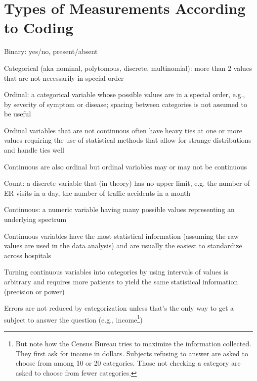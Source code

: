 \section{Types of Measurements According to Coding}  \label{sec:overview-coding}
\bi
 \item Binary: yes/no, present/absent
 \item Categorical (aka nominal, polytomous, discrete, multinomial):
   more than 2 values that are not necessarily in special order
 \item Ordinal: a categorical variable whose possible values are in a
   special order, e.g., by severity of symptom or disease; spacing
   between categories is not assumed to be useful
  \bi
  \item Ordinal variables that are not continuous often have heavy
    ties at one or more values requiring the use of statistical
    methods that allow for strange distributions and handle ties well
  \item Continuous are also ordinal but ordinal variables may or may
    not be continuous
  \ei
 \item Count: a discrete variable that (in theory) has no upper limit, e.g. the number of ER visits in a day, the number of traffic accidents in a month
 \item Continuous: a numeric variable having many possible values
   representing an underlying spectrum
 \item Continuous variables have the most statistical information
  (assuming the raw values are used in the data analysis) and
  are usually the easiest to standardize across hospitals
 \item Turning continuous variables
  into categories by using intervals of values is arbitrary and
  requires more patients to yield the same statistical information
  (precision or power)
 \item Errors are not reduced by categorization unless that's the only
   way to get a subject to answer the question (e.g.,
 income\footnote{But note how the Census Bureau tries to maximize the
 information collected.  They first ask for income in
 dollars.  Subjects refusing to answer are asked to choose from among
 10 or 20 categories.  Those not checking a category are asked to
 choose from fewer categories.})
\ei

